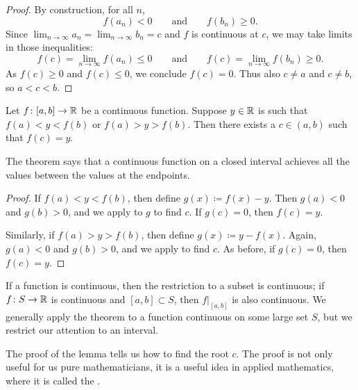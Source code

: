 \begin{proof}
By construction, for all $n$,
\begin{equation*}
f(a_n) < 0
\qquad \text{and} \qquad
f(b_n) \geq 0 .
\end{equation*}
Since
$\lim_{n\to\infty} a_n = \lim_{n\to\infty} b_n = c$
and $f$ is continuous at $c$, we may take 
limits in those inequalities:
\begin{equation*}
f(c) = \lim_{n\to\infty} f(a_n) \leq 0
\qquad \text{and} \qquad
f(c) = \lim_{n\to\infty} f(b_n) \geq 0 .
\end{equation*}
As $f(c) \geq 0$ and 
$f(c) \leq 0$, we conclude $f(c) = 0$.
Thus also $c \neq a$ and $c \neq b$, so
$a < c < b$.
\end{proof}

\begin{thm} \label{IVT:thm}
Let $f \colon [a,b] \to {\mathbb{R}}$ be a continuous function.
Suppose $y \in {\mathbb{R}}$ is such that $f(a) < y < f(b)$
or $f(a) > y > f(b)$.  Then there exists a $c \in (a,b)$
such that $f(c) = y$.
\end{thm}

The theorem says that a continuous function on a closed interval
achieves all the values between the values at the endpoints.

\begin{proof}
If $f(a) < y < f(b)$, then define $g(x) \coloneqq f(x)-y$.  Then 
$g(a) < 0$ and $g(b) > 0$, and we apply 
to $g$ to find $c$.  If $g(c) = 0$, then $f(c) = y$.

Similarly, if $f(a) > y > f(b)$, then define $g(x) \coloneqq y-f(x)$.
Again, $g(a) < 0$ and $g(b) > 0$, and we apply  to
find $c$.
As before, if $g(c) = 0$, then $f(c) = y$.
\end{proof}

If a function is continuous, then the restriction
to a subset is continuous; if $f \colon S \to {\mathbb{R}}$ is continuous and
$[a,b] \subset S$, then $f|_{[a,b]}$ is also continuous.  We generally
apply the theorem to a function continuous on some large set $S$,
but we restrict our attention to an interval.


The proof of the lemma tells us how to find the root $c$.  The
proof is not only useful for us pure mathematicians,
it is a useful idea in applied mathematics,
where it is called the \emph{}.


